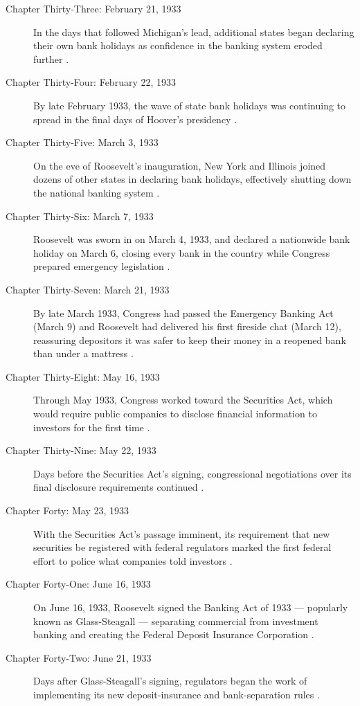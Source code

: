 \documentclass[11pt]{article}
\begin{document}
\begin{description}
\item[Chapter Thirty-Three: February 21, 1933] In the days that followed
Michigan's lead, additional states began declaring their own bank holidays as
confidence in the banking system eroded further \autocite{michiganholiday1933}.

\item[Chapter Thirty-Four: February 22, 1933] By late February 1933, the wave
of state bank holidays was continuing to spread in the final days of Hoover's
presidency \autocite{michiganholiday1933}.

\item[Chapter Thirty-Five: March 3, 1933] On the eve of Roosevelt's
inauguration, New York and Illinois joined dozens of other states in
declaring bank holidays, effectively shutting down the national banking
system \autocite{emergencybankingact1933wiki}.

\item[Chapter Thirty-Six: March 7, 1933] Roosevelt was sworn in on March 4,
1933, and declared a nationwide bank holiday on March 6, closing every bank
in the country while Congress prepared emergency legislation
\autocite{emergencybankingact1933wiki}.

\item[Chapter Thirty-Seven: March 21, 1933] By late March 1933, Congress had
passed the Emergency Banking Act (March 9) and Roosevelt had delivered his
first fireside chat (March 12), reassuring depositors it was safer to keep
their money in a reopened bank than under a mattress
\autocite{emergencybankingact1933wiki}.

\item[Chapter Thirty-Eight: May 16, 1933] Through May 1933, Congress worked
toward the Securities Act, which would require public companies to disclose
financial information to investors for the first time
\autocite{securitiesact1933wiki}.

\item[Chapter Thirty-Nine: May 22, 1933] Days before the Securities Act's
signing, congressional negotiations over its final disclosure requirements
continued \autocite{securitiesact1933wiki}.

\item[Chapter Forty: May 23, 1933] With the Securities Act's passage
imminent, its requirement that new securities be registered with federal
regulators marked the first federal effort to police what companies told
investors \autocite{securitiesact1933wiki}.

\item[Chapter Forty-One: June 16, 1933] On June 16, 1933, Roosevelt signed
the Banking Act of 1933 --- popularly known as Glass-Steagall --- separating
commercial from investment banking and creating the Federal Deposit Insurance
Corporation \autocite{glasssteagall1933wiki}.

\item[Chapter Forty-Two: June 21, 1933] Days after Glass-Steagall's signing,
regulators began the work of implementing its new deposit-insurance and
bank-separation rules \autocite{glasssteagall1933wiki}.

\end{description}
\end{document}
